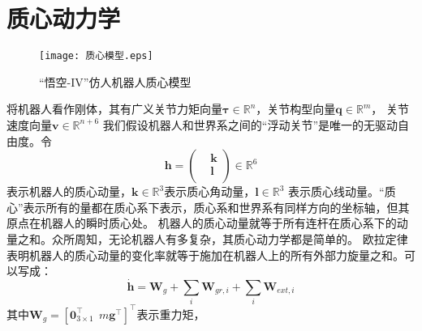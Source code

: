 \section{质心动力学}
\label{sec:dynamics}
\begin{figure}[htbp]
    \centering
    \texttt{[image: 质心模型.eps]}
    \caption{\label{fig:com_model}“悟空-IV”仿人机器人质心模型}
\end{figure}
将机器人看作刚体，其有广义关节力矩向量$\boldsymbol{\tau} \in {{\mathbb{R}}^{n}}$，关节构型向量$\boldsymbol{q}\in {{\mathbb{R}}^{m}}$，
关节速度向量$\boldsymbol{v}\in {{\mathbb{R}}^{n+6}}$
我们假设机器人和世界系之间的“浮动关节”是唯一的无驱动自由度。令
\begin{equation}
    \label{equ:momentum}
    \boldsymbol{h}=\left(\begin{aligned}
        & \boldsymbol{k} \\ 
       & \boldsymbol{l} \\ 
      \end{aligned} \right)\in \mathbb{R}^{6}
\end{equation}
表示机器人的质心动量，$\boldsymbol{k}\in {{\mathbb{R}}^{3}}$表示质心角动量，$\boldsymbol{l}\in {{\mathbb{R}}^{3}}$
表示质心线动量。“质心”表示所有的量都在质心系下表示，质心系和世界系有同样方向的坐标轴，但其原点在机器人的瞬时质心处。
机器人的质心动量就等于所有连杆在质心系下的动量之和。众所周知，无论机器人有多复杂，其质心动力学都是简单的。
欧拉定律表明机器人的质心动量的变化率就等于施加在机器人上的所有外部力旋量之和。可以写成：
\begin{equation}
    \label{equ:euler's_law}
    \dot{\boldsymbol{h}}={{\boldsymbol{W}}_{g}}+\sum\limits_{i}{{{\boldsymbol{W}}_{gr,i}}}+\sum\limits_{i}{{{\boldsymbol{W}}_{ext,i}}}
\end{equation}
其中${{\boldsymbol{W}}_{g}}={{[\mathbf{0}_{3\times 1}^{\top }\ \ m{{\mathbf{g}}^{\top }}]}^{\top }}$表示重力矩，
